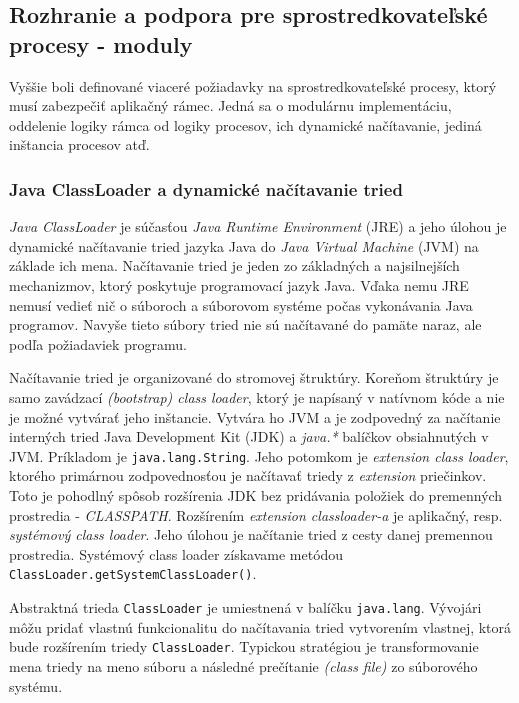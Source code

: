 
\subsection{Rozhranie a podpora pre sprostredkovateľské procesy - moduly} \label{sec:intermediate_process}

Vyššie boli definované viaceré požiadavky na sprostredkovateľské procesy, ktorý musí zabezpečiť 
aplikačný rámec. Jedná sa o modulárnu implementáciu, oddelenie logiky rámca od logiky procesov, 
ich dynamické načítavanie, jediná inštancia procesov atď. 

\subsubsection{Java ClassLoader a dynamické načítavanie tried} \label{sec:classLoader}

\emph{Java ClassLoader} je súčasťou \emph{Java Runtime Environment} (JRE) a jeho úlohou je dynamické
načítavanie tried jazyka Java do \emph{Java Virtual Machine} (JVM) na základe ich mena. 
Načítavanie tried je jeden zo základných a najsilnejších mechanizmov, ktorý poskytuje programovací jazyk
Java. Vďaka nemu JRE nemusí vedieť nič o súboroch a súborovom systéme počas vykonávania Java programov. 
Navyše tieto súbory tried nie sú načítavané do pamäte naraz, ale podľa požiadaviek 
programu. \citep{mcmanis, travis}

Načítavanie tried je organizované do stromovej štruktúry. Koreňom štruktúry je samo zavádzací 
\emph{(bootstrap) class loader}, ktorý je napísaný v natívnom kóde a nie je možné vytvárať jeho inštancie. 
Vytvára ho 
JVM a je zodpovedný za načítanie interných tried Java Development Kit (JDK) a \emph{java.*} balíčkov 
obsiahnutých v JVM. Príkladom je \verb|java.lang.String|. Jeho potomkom je \emph{extension class loader},
ktorého primárnou zodpovednosťou je načítavať triedy z \emph{extension} priečinkov. Toto je pohodlný 
spôsob rozšírenia JDK bez pridávania položiek do premenných prostredia - \emph{CLASSPATH}. 
Rozšírením \emph{extension classloader-a} je aplikačný, resp. \emph{systémový class loader}. Jeho úlohou 
je načítanie tried z cesty danej premennou prostredia. Systémový class loader získavame metódou 
\verb|ClassLoader.getSystemClassLoader()|. \citep{techjava, antl}

Abstraktná trieda \verb|ClassLoader| je umiestnená v balíčku \verb|java.lang|. Vývojári môžu pridať 
vlastnú 
funkcionalitu do načítavania tried vytvorením vlastnej, ktorá bude rozšírením triedy 
\verb|ClassLoader|. Typickou stratégiou je transformovanie mena triedy na meno súboru a následné 
prečítanie  \emph{(class file)} zo súborového systému. \citep{christudas, classloader}

